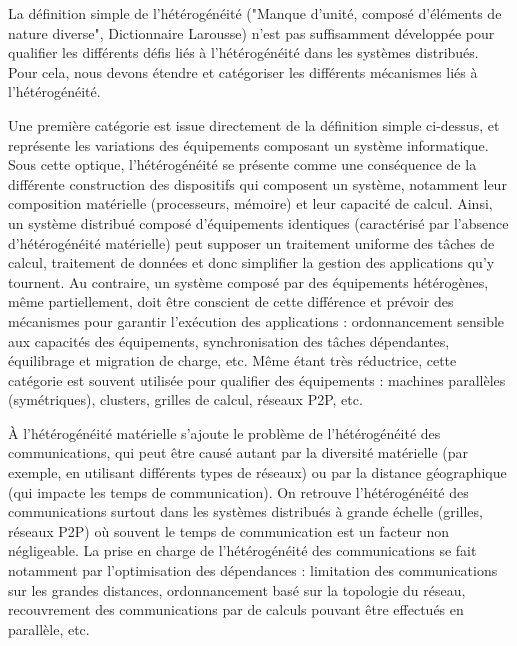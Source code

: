 La définition simple de l'hétérogénéité ("Manque d'unité, composé d'éléments de nature diverse", Dictionnaire Larousse) n'est pas suffisamment développée pour qualifier les différents défis liés à l'hétérogénéité dans les systèmes distribués. Pour cela, nous devons étendre et catégoriser les différents mécanismes liés à l'hétérogénéité.

Une première catégorie est issue directement de la définition simple ci-dessus, et représente les variations des équipements composant un système informatique. Sous cette optique, l'hétérogénéité se présente comme une conséquence de la différente construction des dispositifs qui composent un système, notamment leur composition matérielle (processeurs, mémoire) et leur capacité de calcul. Ainsi, un système distribué composé d'équipements identiques (caractérisé par l'absence d'hétérogénéité matérielle) peut supposer un traitement uniforme des tâches de calcul, traitement de données et donc simplifier la gestion des applications qu'y tournent. Au contraire, un système composé par des équipements hétérogènes, même partiellement, doit être conscient de cette différence et prévoir des mécanismes pour garantir l'exécution des applications : ordonnancement sensible aux capacités des équipements, synchronisation des tâches dépendantes, équilibrage et migration de charge, etc.  Même étant très réductrice, cette catégorie est souvent utilisée pour qualifier des équipements : machines parallèles (symétriques), clusters, grilles de calcul, réseaux P2P, etc.

À l'hétérogénéité matérielle s'ajoute le problème de l'hétérogénéité des communications, qui peut être causé autant par la diversité matérielle (par exemple, en utilisant différents types de réseaux) ou par la distance géographique (qui impacte les temps de communication). On retrouve l'hétérogénéité des communications surtout dans les systèmes distribués à grande échelle (grilles, réseaux P2P) où souvent le temps de communication est un facteur non négligeable. La prise en charge de l'hétérogénéité des communications se fait notamment par l'optimisation des dépendances : limitation des communications sur les grandes distances, ordonnancement basé sur la topologie du réseau, recouvrement des communications par de calculs pouvant être effectués en parallèle, etc.

